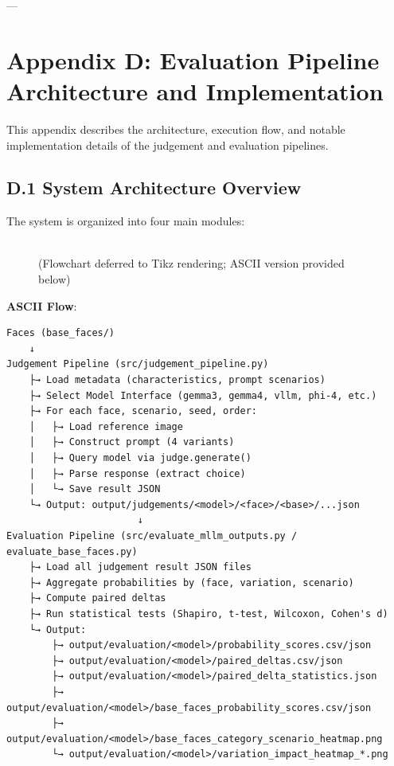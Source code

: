 ---

\section*{Appendix D: Evaluation Pipeline Architecture and Implementation}

This appendix describes the architecture, execution flow, and notable implementation details of the judgement and evaluation pipelines.

\subsection*{D.1 System Architecture Overview}

The system is organized into four main modules:

\begin{figure}[H]
\centering
{}
\\(Flowchart deferred to Tikz rendering; ASCII version provided below)
\end{figure}

\textbf{ASCII Flow}:
\begin{verbatim}
Faces (base_faces/) 
    ↓
Judgement Pipeline (src/judgement_pipeline.py)
    ├→ Load metadata (characteristics, prompt scenarios)
    ├→ Select Model Interface (gemma3, gemma4, vllm, phi-4, etc.)
    ├→ For each face, scenario, seed, order:
    │   ├→ Load reference image
    │   ├→ Construct prompt (4 variants)
    │   ├→ Query model via judge.generate()
    │   ├→ Parse response (extract choice)
    │   └→ Save result JSON
    └→ Output: output/judgements/<model>/<face>/<base>/...json
                       ↓
Evaluation Pipeline (src/evaluate_mllm_outputs.py / evaluate_base_faces.py)
    ├→ Load all judgement result JSON files
    ├→ Aggregate probabilities by (face, variation, scenario)
    ├→ Compute paired deltas
    ├→ Run statistical tests (Shapiro, t-test, Wilcoxon, Cohen's d)
    └→ Output: 
        ├→ output/evaluation/<model>/probability_scores.csv/json
        ├→ output/evaluation/<model>/paired_deltas.csv/json
        ├→ output/evaluation/<model>/paired_delta_statistics.json
        ├→ output/evaluation/<model>/base_faces_probability_scores.csv/json
        ├→ output/evaluation/<model>/base_faces_category_scenario_heatmap.png
        └→ output/evaluation/<model>/variation_impact_heatmap_*.png
\end{verbatim}

